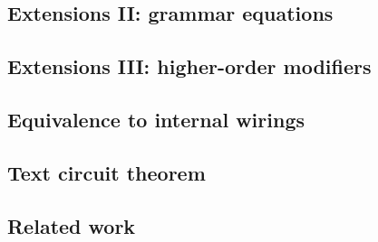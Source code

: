 
\begin{example}

\end{example}


\begin{example}

\end{example}

\subsection{Extensions II: grammar equations}


\begin{example}

\end{example}


\begin{example}

\end{example}


\begin{example}

\end{example}

\subsection{Extensions III: higher-order modifiers}


\begin{example}

\end{example}


\begin{example}

\end{example}

\subsection{Equivalence to internal wirings}

\subsection{Text circuit theorem}

\subsection{Related work}